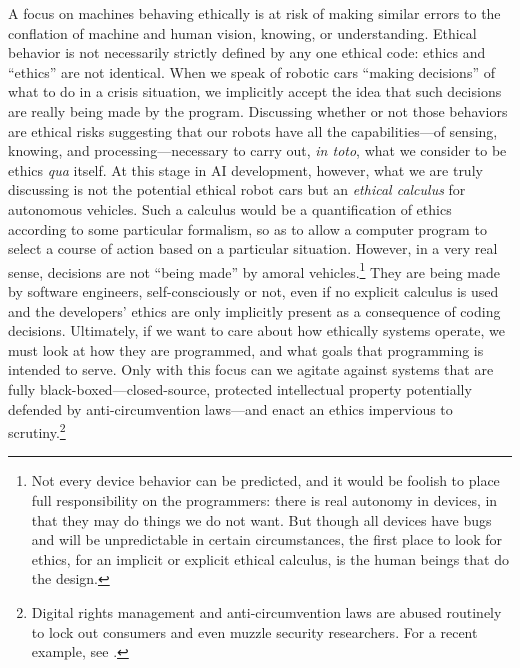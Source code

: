 A focus on machines behaving ethically is at risk of making similar
errors to the conflation of machine and human vision, knowing, or
understanding. Ethical behavior is not necessarily strictly defined by
any one ethical code:  ethics and ``ethics'' are not identical. When we
speak of robotic cars ``making decisions'' of what to do in a crisis
situation, we implicitly accept the idea that such decisions are
really being made by the program. Discussing whether or not those
behaviors are ethical risks suggesting that our robots have all the
capabilities---of sensing, knowing, and processing---necessary to
carry out, \emph{in toto}, what we consider to be ethics \emph{qua} itself. At this
stage in AI development, however, what we are truly discussing is not
the potential ethical robot cars but an \emph{ethical calculus} for
autonomous vehicles. Such a calculus would be a quantification of
ethics according to some particular formalism, so as to allow a
computer program to select a course of action based on a particular
situation. However, in a very real sense, decisions are not
``being made'' by amoral vehicles.\footnote{Not every device behavior
can be predicted, and it would be foolish to place full responsibility
on the programmers: there is real autonomy in devices, in that they
may do things we do not want. But though all devices have bugs and
will be unpredictable in certain circumstances, the first place to
look for ethics, for an implicit or explicit ethical calculus, is the
human beings 
that do the design.} They are being made by software engineers,
self-consciously or not, even if no
explicit calculus is used and the developers' ethics are only
implicitly present as a consequence of coding decisions. Ultimately,
if we want to care about how ethically systems
operate, we must look at how they are programmed, and what goals that
programming is intended to serve. Only with this focus can we agitate
against systems that are fully black-boxed---closed-source, protected
intellectual property potentially defended by anti-circumvention
laws---and enact an ethics impervious to scrutiny.\footnote{Digital
  rights management and anti-circumvention laws are abused routinely
  to lock out consumers and even muzzle security researchers. For a
  recent example, see \cite{higgins}.
}



